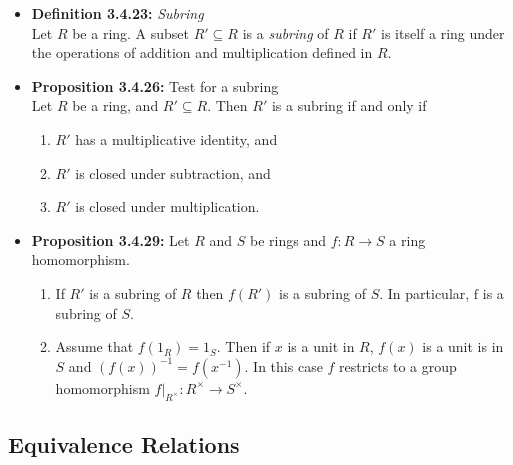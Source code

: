 \documentclass[11pt,a4paper]{article}
\begin{document}
\begin{itemize}
    \item \textbf{Definition 3.4.23:} \emph{Subring} \\
        Let $R$ be a ring.
        A subset $R' \subseteq R$ is a \emph{subring} of $R$ if $R'$ is itself a ring under the
        operations of addition and multiplication defined in $R$.

    \item \textbf{Proposition 3.4.26:} Test for a subring \\
        Let $R$ be a ring, and $R' \subseteq R$.
        Then $R'$ is a subring if and only if
        \begin{enumerate}
            \item $R'$ has a multiplicative identity, and
            \item $R'$ is closed under subtraction, and
            \item $R'$ is closed under multiplication.
        \end{enumerate}

    \item \textbf{Proposition 3.4.29:} Let $R$ and $S$ be rings and $f : R \to S$
        a ring homomorphism.
        \begin{enumerate}
            \item If $R'$ is a subring of $R$ then $f(R')$ is a subring of $S$.
                In particular, $\mathrm{f}$ is a subring of $S$.
            \item Assume that $f(1_R) = 1_S$.
                Then if $x$ is a unit in $R$, $f(x)$ is a unit is in $S$ and
                ${(f(x))}^{-1} = f{(x^{-1})}$.
                In this case $f$ restricts to a group homomorphism
                $f|_{R^\times} : R^\times \to S^\times$.
        \end{enumerate}
\end{itemize}

\subsection{Equivalence Relations}
\end{document}
